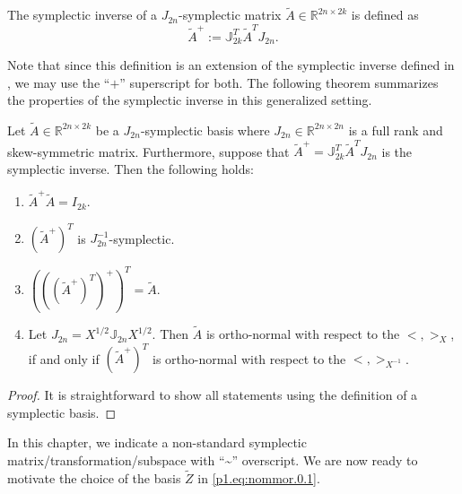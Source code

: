 \begin{definition}
The symplectic inverse of a $J_{2n}$-symplectic matrix $\tilde A\in \mathbb R^{2n\times 2k}$ is defined as
\begin{equation} \label{p1.eq:nommor.0.4}
	\tilde A^{+} := \mathbb J_{2k}^T \tilde A^T J_{2n}.
\end{equation}
\end{definition}
Note that since this definition is an extension of the symplectic inverse defined in , we may use the ``$+$'' superscript for both. The following theorem summarizes the properties of the symplectic inverse in this generalized setting.

\begin{proposition} \label{thm:2}
Let $\tilde A\in \mathbb R^{2n\times 2k}$ be a $J_{2n}$-symplectic basis where $J_{2n}\in\mathbb R^{2n\times 2n}$ is a full rank and skew-symmetric matrix. Furthermore, suppose that $\tilde A^{+} = \mathbb{J}_{2k}^T \tilde A^T J_{2n}$ is the symplectic inverse. Then the following holds:
\begin{enumerate} [label=(\alph*)]
\item $\tilde A^+ \tilde A = I_{2k}$.
\item $(\tilde A^+)^T$ is $J_{2n}^{-1}$-symplectic.
\item $\left(\left(\left(\tilde A^+\right)^T\right)^+\right)^T = \tilde A$.
\item Let $J_{2n}=X^{1/2}\mathbb J_{2n} X^{1/2}$. Then $\tilde A$ is ortho-normal with respect to the $<,>_X$, if and only if $(\tilde A^+)^T$ is ortho-normal with respect to the $<,>_{X^{-1}}$.
\end{enumerate}
\end{proposition}
\begin{proof}
It is straightforward to show all statements using the definition of a symplectic basis.
\end{proof}


In this chapter, we indicate a non-standard symplectic matrix/transformation/subspace with ``\textasciitilde'' overscript. We are now ready to motivate the choice of the basis $\tilde Z$ in \eqref{p1.eq:nommor.0.1}.

